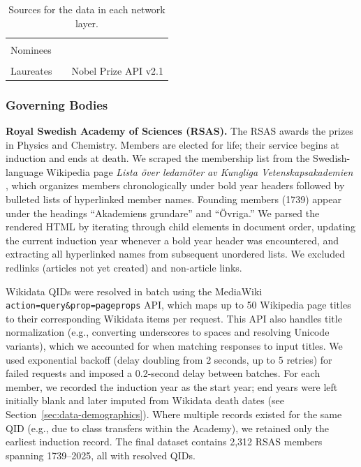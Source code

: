 \documentclass[11pt]{article}
\begin{document}
\begin{table}[t!]
\begin{tabular}{lll}
                              &                                     &                                                                                                                                                    \\
Nominees                      &                                     & \citet{NobelPrizeWebsite}                                               \\
                              &                                     &                                                                                                                                                    \\
Laureates                     &                                     & Nobel Prize API v2.1                                                                                                                                           \\ \hline
\end{tabular}
\caption{Sources for the data in each network layer.\label{tab2}}
\end{table}

\subsubsection{Governing Bodies}
\label{sec:data-governing}

\textbf{Royal Swedish Academy of Sciences (RSAS).} The RSAS awards the prizes in Physics and Chemistry. Members are elected for life; their service begins at induction and ends at death. We scraped the membership list from the Swedish-language Wikipedia page \emph{Lista \"over ledam\"oter av Kungliga Vetenskapsakademien} \citep{Ledamotsregister}, which organizes members chronologically under bold year headers followed by bulleted lists of hyperlinked member names. Founding members (1739) appear under the headings ``Akademiens grundare'' and ``\"Ovriga.'' We parsed the rendered HTML by iterating through child elements in document order, updating the current induction year whenever a bold year header was encountered, and extracting all hyperlinked names from subsequent unordered lists. We excluded redlinks (articles not yet created) and non-article links.

Wikidata QIDs were resolved in batch using the MediaWiki \texttt{action=query\&prop=pageprops} API, which maps up to 50 Wikipedia page titles to their corresponding Wikidata items per request. This API also handles title normalization (e.g., converting underscores to spaces and resolving Unicode variants), which we accounted for when matching responses to input titles. We used exponential backoff (delay doubling from 2 seconds, up to 5 retries) for failed requests and imposed a 0.2-second delay between batches. For each member, we recorded the induction year as the start year; end years were left initially blank and later imputed from Wikidata death dates (see Section~\ref{sec:data-demographics}). Where multiple records existed for the same QID (e.g., due to class transfers within the Academy), we retained only the earliest induction record. The final dataset contains 2{,}312 RSAS members spanning 1739--2025, all with resolved QIDs.
\end{document}
